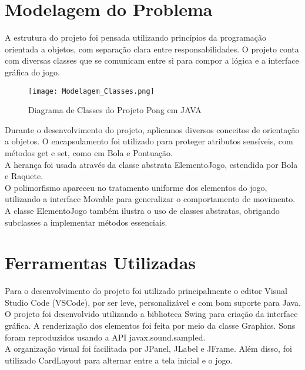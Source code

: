 \documentclass[a4paper, 12pt]{article}
\begin{document}
\section{Modelagem do Problema}

A estrutura do projeto foi pensada utilizando princípios da programação orientada a objetos, com separação clara entre responsabilidades. O projeto conta com diversas classes que se comunicam entre si para compor a lógica e a interface gráfica do jogo. \\

\begin{figure}[H]
    \centering
    \texttt{[image: Modelagem\_Classes.png]}
    \caption{Diagrama de Classes do Projeto Pong em JAVA
    }
    \label{fig:enter-label}
\end{figure}

Durante o desenvolvimento do projeto, aplicamos diversos conceitos de orientação a objetos. O encapsulamento foi utilizado para proteger atributos sensíveis, com métodos get e set, como em Bola e Pontuação. \\

A herança foi usada através da classe abstrata ElementoJogo, estendida por Bola e Raquete. \\

O polimorfismo apareceu no tratamento uniforme dos elementos do jogo, utilizando a interface Movable para generalizar o comportamento de movimento. \\

A classe ElementoJogo também ilustra o uso de classes abstratas, obrigando subclasses a implementar métodos essenciais. \\
\section{Ferramentas Utilizadas} 

Para o desenvolvimento do projeto foi utilizado principalmente o editor Visual Studio Code (VSCode), por ser leve, personalizável e com bom suporte para Java. \\

O projeto foi desenvolvido utilizando a biblioteca Swing para criação da interface gráfica. A renderização dos elementos foi feita por meio da classe Graphics. Sons foram reproduzidos usando a API javax.sound.sampled. \\

A organização visual foi facilitada por JPanel, JLabel e JFrame. Além disso, foi utilizado CardLayout para alternar entre a tela inicial e o jogo. 
\end{document}
